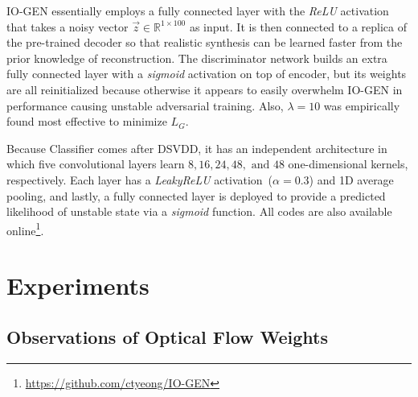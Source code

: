 \documentclass[letterpaper]{article} %
\begin{document}
\mbox{IO-GEN} essentially employs a fully connected layer with the \emph{ReLU}
activation that takes a noisy vector $\vec{z} \in \mathbb{R}^{1 \times
100}$ as input. It is then connected to a replica of the pre-trained decoder
so that realistic synthesis can be learned faster from the prior
knowledge of reconstruction. The discriminator network builds an extra
fully connected layer with a \emph{sigmoid} activation on top of
encoder, but its weights are all reinitialized because otherwise it
appears to easily overwhelm \mbox{IO-GEN} in performance causing unstable
adversarial training. Also, $\lambda=10$ was empirically found most
effective to minimize $\mathit{L_G}$.

Because Classifier comes after DSVDD, it has an independent architecture
in which five convolutional layers learn $8, 16, 24, 48, \text{ and }
48$ one-dimensional kernels, respectively. Each layer has a
\emph{LeakyReLU} activation~($\alpha=0.3$) and 1D average pooling, and
lastly, a fully connected layer is deployed to provide a predicted
likelihood of unstable state via a \emph{sigmoid} function.
All codes are also available 
online\footnote{\url{https://github.com/ctyeong/IO-GEN}}.

\section{Experiments}
\label{sec:experiments}


\subsection{Observations of Optical Flow Weights}
\label{sec:obs_optical_flow_weights}
\end{document}
